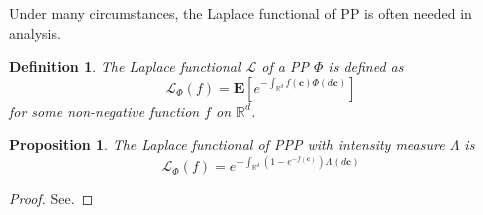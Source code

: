 \documentclass[a4paper,twocolumn]{IEEEtran}
\newtheorem{definition}{\textbf{Definition}}
\newtheorem{proposition}{\textbf{Proposition}}
\begin{document}
Under many circumstances, the Laplace functional of PP is often needed in analysis.
\begin{definition}
The Laplace functional $\mathcal{L}$ of a PP $\Phi$ is defined as
\begin{displaymath}
\mathcal{L}_{\Phi}(f) = \mathbf{E}\left[ e^{-\int_{\mathbb{R}^d} f(\bm{c}) \Phi(d \bm{c})}\right]
\end{displaymath}
for some non-negative function $f$ on $\mathbb{R}^d$.
\end{definition}
\begin{proposition}
The Laplace functional of PPP with intensity measure $\Lambda$ is
\begin{equation}
\mathcal{L}_{\Phi}(f) = e^{-\int_{\mathbb{R}^d}(1-e^{-f(\bm{c})})\Lambda(d \bm{c})}
\end{equation}
\end{proposition}
\begin{proof}
See.
\end{proof}
\end{document}
